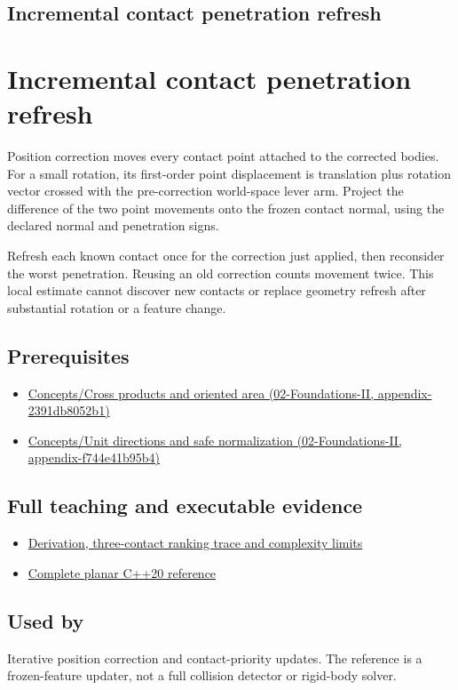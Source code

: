 \hypertarget{appendix-f682275acbdf}{}
\section*{Incremental contact penetration refresh}
\chapter{Incremental contact penetration refresh}\label{appendix-f682275acbdf-incremental-contact-penetration-refresh}

Position correction moves every contact point attached to the corrected bodies. For a small rotation, its first-order point displacement is translation plus rotation vector crossed with the pre-correction world-space lever arm. Project the difference of the two point movements onto the frozen contact normal, using the declared normal and penetration signs.

Refresh each known contact once for the correction just applied, then reconsider the worst penetration. Reusing an old correction counts movement twice. This local estimate cannot discover new contacts or replace geometry refresh after substantial rotation or a feature change.

\section{Prerequisites}\label{appendix-f682275acbdf-prerequisites}

\begin{itemize}
\tightlist
\item
  \href{../02-Foundations-II/main.pdf\#nameddest=appendix-2391db8052b1}{Concepts/Cross products and oriented area (02-Foundations-II, appendix-2391db8052b1)}
\item
  \href{../02-Foundations-II/main.pdf\#nameddest=appendix-f744e41b95b4}{Concepts/Unit directions and safe normalization (02-Foundations-II, appendix-f744e41b95b4)}
\end{itemize}

\section{Full teaching and executable evidence}\label{appendix-f682275acbdf-full-teaching-and-executable-evidence}

\begin{itemize}
\tightlist
\item
  \href{Continuous\%20Notes/Game\%20Engine\%20-\%20From\%20First\%20Frame\%20to\%20Living\%20Worlds\#Refresh\%20neighboring\%20penetrations\%20after\%20position\%20correction}{Derivation, three-contact ranking trace and complexity limits}
\item
  \href{Continuous\%20Notes/Game\%20Engine\%20-\%20From\%20First\%20Frame\%20to\%20Living\%20Worlds\#A\%20planar\%20penetration\%20refresh\%20witness}{Complete planar C++20 reference}
\end{itemize}

\section{Used by}\label{appendix-f682275acbdf-used-by}

Iterative position correction and contact-priority updates. The reference is a frozen-feature updater, not a full collision detector or rigid-body solver.
